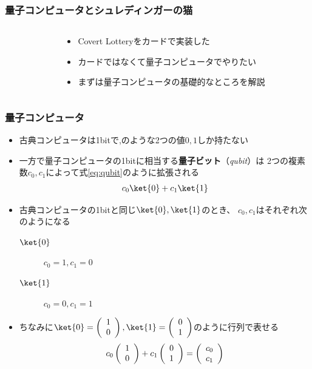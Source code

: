 \begin{frame}
  \frametitle{量子コンピュータとシュレディンガーの猫}

  \begin{columns}
    \begin{column}{0.55\textwidth}
      \begin{minipage}[t][.6\textheight][t]{\textwidth}
        \tableofcontents[currentsection]
      \end{minipage}
    \end{column}
    \begin{column}{0.45\textwidth}
      \begin{itemize}
        \item<+-> Covert Lotteryをカードで実装した
        
        \item<+-> カードではなくて量子コンピュータでやりたい

        \item<+-> まずは量子コンピュータの基礎的なところを解説
      \end{itemize}
    \end{column}
  \end{columns}
\end{frame}

\begin{frame}
  \frametitle{量子コンピュータ}

  \pause
  \begin{itemize}
    \item<+-> 古典コンピュータは1bitで\heartcard,\clubcard のような2つの値$0,1$しか持たない

    \item<+-> 一方で量子コンピュータの1bitに相当する\textbf{量子ビット}（\emph{qubit}）は
    2つの複素数$c_0, c_1$によって式\ref{eq:qubit}のように拡張される
    \begin{align}
      c_0\ket{0} + c_1\ket{1} \label{eq:qubit}
    \end{align}

    \item<+-> 古典コンピュータの1bitと同じ$\ket{0}, \ket{1}$のとき、
    $c_0, c_1$はそれぞれ次のようになる
    \begin{description}
      \item[$\ket{0}$] $c_0 = 1, c_1 = 0$
      \item[$\ket{1}$] $c_0 = 0, c_1 = 1$
    \end{description}

    \item<+-> ちなみに$\ket{0} = \Zero, \ket{1} = \One$のように行列で表せる
    \[
      c_0\left( \begin{array}{c} 1 \\ 0 \end{array} \right) + c_1\left( \begin{array}{c} 0 \\ 1 \end{array} \right) = \left(
        \begin{array}{c}
          c_0 \\
          c_1
        \end{array}
      \right)
    \]
  \end{itemize}
\end{frame}

